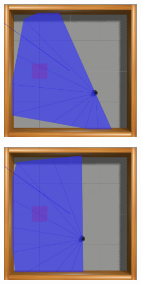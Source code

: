 \begin{figure}[H]
\begin{center}
\begin{subfigure}[b]{0.60\textwidth}
\begin{subfigure}[b]{0.24\textwidth}
            \includegraphics[width=\textwidth]{imagens/simulated_envs/sim_env1_sac/2.png}
        \end{subfigure}
        \hfill
        \begin{subfigure}[b]{0.24\textwidth}
            \includegraphics[width=\textwidth]{imagens/simulated_envs/sim_env1_sac/3.png}

\end{subfigure}
\end{subfigure}
\end{center}
\end{figure}
